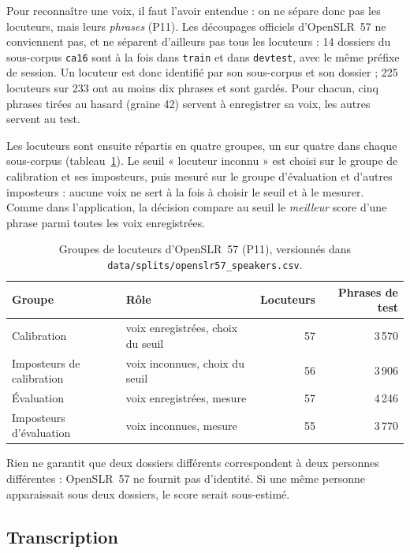 Pour reconnaître une voix, il faut l'avoir entendue : on ne sépare donc pas les locuteurs,
mais leurs \emph{phrases} (P11). Les découpages officiels d'OpenSLR~57 ne conviennent pas, et
ne séparent d'ailleurs pas tous les locuteurs : 14 dossiers du sous-corpus \texttt{ca16} sont
à la fois dans \texttt{train} et dans \texttt{devtest}, avec le même préfixe de session. Un
locuteur est donc identifié par son sous-corpus et son dossier ; 225 locuteurs sur 233 ont au
moins dix phrases et sont gardés. Pour chacun, cinq phrases tirées au hasard (graine 42)
servent à enregistrer sa voix, les autres servent au test.

Les locuteurs sont ensuite répartis en quatre groupes, un sur quatre dans chaque sous-corpus
(tableau~\ref{tab:p11}). Le seuil « locuteur inconnu » est choisi sur le groupe de calibration
et ses imposteurs, puis mesuré sur le groupe d'évaluation et d'autres imposteurs : aucune voix
ne sert à la fois à choisir le seuil et à le mesurer. Comme dans l'application, la décision
compare au seuil le \emph{meilleur} score d'une phrase parmi toutes les voix enregistrées.

\begin{table}[ht]
  \centering
  \small
  \begin{tabular}{@{}llrr@{}}
    \toprule
    Groupe & Rôle & Locuteurs & Phrases de test \\
    \midrule
    Calibration               & voix enregistrées, choix du seuil & 57 & 3\,570 \\
    Imposteurs de calibration & voix inconnues, choix du seuil    & 56 & 3\,906 \\
    Évaluation                & voix enregistrées, mesure         & 57 & 4\,246 \\
    Imposteurs d'évaluation   & voix inconnues, mesure            & 55 & 3\,770 \\
    \bottomrule
  \end{tabular}
  \caption{Groupes de locuteurs d'OpenSLR~57 (P11), versionnés dans
    \texttt{data/splits/openslr57\_speakers.csv}.}
  \label{tab:p11}
\end{table}

Rien ne garantit que deux dossiers différents correspondent à deux personnes différentes :
OpenSLR~57 ne fournit pas d'identité. Si une même personne apparaissait sous deux dossiers, le
score serait sous-estimé.

\subsection{Transcription}
\label{sec:p12}

